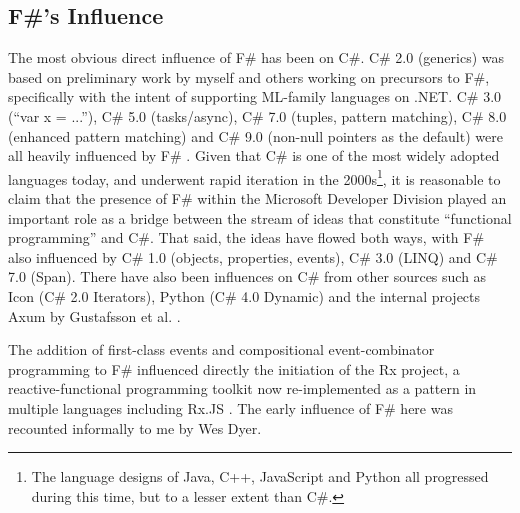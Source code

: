 \documentclass[acmsmall,screen]{acmart}
\begin{document}
\subsection*{F\#'s Influence}

The most obvious direct influence of F\# has been on C\#. C\# 2.0 (generics) was based on preliminary work
by myself and others working on precursors to F\#, specifically with the intent of supporting ML-family
languages on .NET. C\# 3.0 (“var x = ...”), C\# 5.0 (tasks/async), C\# 7.0 (tuples, pattern matching),
C\# 8.0 (enhanced pattern matching) and C\# 9.0 (non-null pointers as the default) were all heavily influenced by F\# \citep{RefUseFSharp}. Given that C\# is one of
the most widely adopted languages today, and underwent rapid iteration in the 2000s\footnote{The language designs of Java, C++, JavaScript and Python
all progressed during this time, but to a lesser extent than C\#.}, it is reasonable to
claim that the presence of F\# within the Microsoft Developer Division played an important role as a bridge
between the stream of ideas that constitute “functional programming” and C\#.   That said, the ideas have
flowed both ways, with F\# also influenced by C\# 1.0 (objects, properties, events), C\# 3.0 (LINQ) and C\# 7.0 (Span).
There have also been influences on C\# from other sources such as Icon (C\# 2.0 Iterators), Python (C\# 4.0 Dynamic) and
the internal projects Axum by Gustafsson et al. \citep{RefAxum}.

The addition of first-class events and compositional event-combinator programming to F\# influenced directly the initiation
of the Rx project, a reactive-functional programming toolkit now re-implemented as a pattern in multiple languages
including Rx.JS \citep{RefFirstClassEventsBlog}.  The early influence of F\# here was recounted informally to me by Wes Dyer. 
\end{document}

